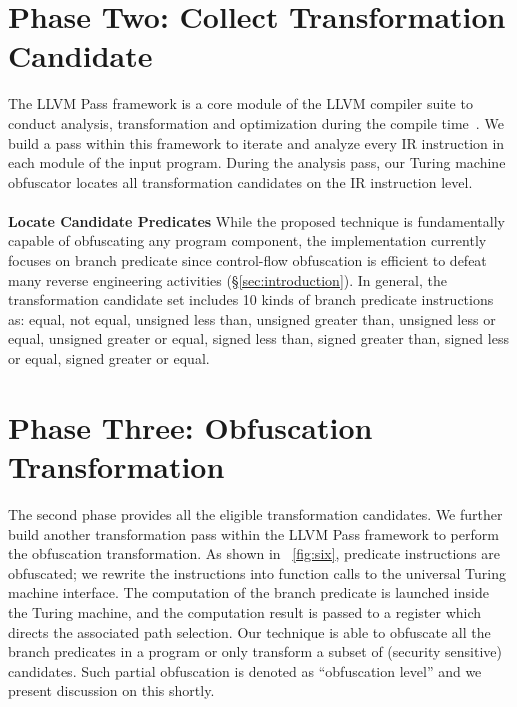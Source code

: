 \section{Phase Two: Collect Transformation Candidate}
\label{subsec:phase-two}
The LLVM Pass framework is a core module of the LLVM compiler suite to conduct
analysis, transformation and optimization during the compile
time~\cite{LLVM}. We build a pass within this framework to iterate and
analyze every IR instruction in each module of the input program. During the
analysis pass, our Turing machine obfuscator locates all transformation
candidates on the IR instruction level.
\\\\
\noindent \textbf{Locate Candidate Predicates} While the proposed technique is
fundamentally capable of obfuscating any program component, the implementation
currently focuses on branch predicate since control-flow obfuscation is
efficient to defeat many reverse engineering activities
(\S\ref{sec:introduction}). In general, the transformation candidate set
includes 10 kinds of branch predicate instructions as: equal, not equal,
unsigned less than, unsigned greater than, unsigned less or equal, unsigned
greater or equal, signed less than, signed greater than, signed less or equal,
signed greater or equal.

\section{Phase Three: Obfuscation Transformation}
\label{subsec:phase-three}
The second phase provides all the eligible transformation candidates. We further
build another transformation pass within the LLVM Pass framework to perform the
obfuscation transformation. As shown in \F~\ref{fig:six}, predicate instructions
are obfuscated; we rewrite the instructions into function calls to the universal
Turing machine interface. The computation of the branch predicate is launched
inside the Turing machine, and the computation result is passed to a register
which directs the associated path selection. Our technique is able to obfuscate all the
branch predicates in a program or only transform a subset of (security
sensitive) candidates. Such partial obfuscation is denoted as ``obfuscation
level'' and we present discussion on this shortly.

